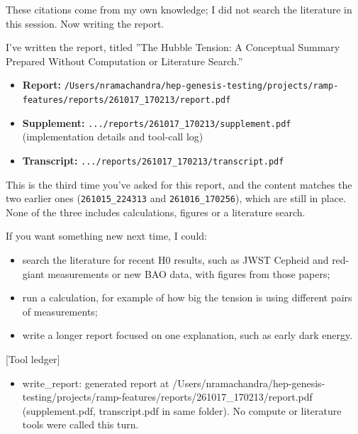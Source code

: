 \documentclass[11pt,a4paper]{article}
\begin{document}
These citations come from my own knowledge; I did not search the literature in this session. Now writing the report.

I've written the report, titled ''The Hubble Tension: A Conceptual Summary Prepared Without Computation or Literature Search.''

\begin{itemize}
  \item \textbf{Report:} \texttt{/\allowbreak{}Users/\allowbreak{}nramachandra/\allowbreak{}hep-genesis-testing/\allowbreak{}projects/\allowbreak{}ramp-features/\allowbreak{}reports/\allowbreak{}261017\_\allowbreak{}170213/\allowbreak{}report.pdf}
  \item \textbf{Supplement:} \texttt{.../\allowbreak{}reports/\allowbreak{}261017\_\allowbreak{}170213/\allowbreak{}supplement.pdf} (implementation details and tool-call log)
  \item \textbf{Transcript:} \texttt{.../\allowbreak{}reports/\allowbreak{}261017\_\allowbreak{}170213/\allowbreak{}transcript.pdf}
\end{itemize}
This is the third time you've asked for this report, and the content matches the two earlier ones (\texttt{261015\_\allowbreak{}224313} and \texttt{261016\_\allowbreak{}170256}), which are still in place. None of the three includes calculations, figures or a literature search.

If you want something new next time, I could:

\begin{itemize}
  \item search the literature for recent H0 results, such as JWST Cepheid and red-giant measurements or new BAO data, with figures from those papers;
  \item run a calculation, for example of how big the tension is using different pairs of measurements;
  \item write a longer report focused on one explanation, such as early dark energy.
\end{itemize}
[Tool ledger]

\begin{itemize}
  \item write\_report: generated report at /Users/nramachandra/hep-genesis-testing/projects/ramp-features/reports/261017\_170213/report.pdf (supplement.pdf, transcript.pdf in same folder). No compute or literature tools were called this turn.
\end{itemize}
\end{document}
